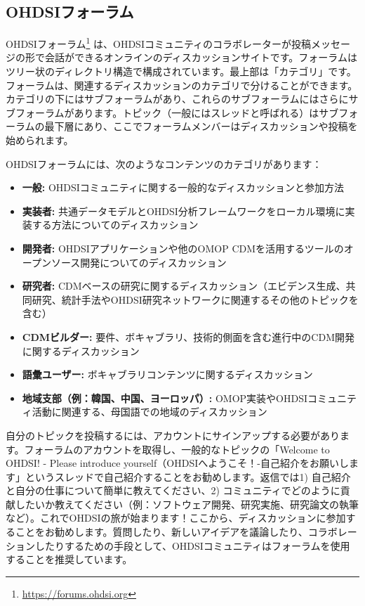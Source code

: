 \documentclass[
  11pt]{book}
\providecommand{\tightlist}{%
  \setlength{\itemsep}{0pt}\setlength{\parskip}{0pt}}
\theoremstyle{definition}
\theoremstyle{definition}
\theoremstyle{definition}
\theoremstyle{definition}
\theoremstyle{remark}
\begin{document}
\subsection{OHDSIフォーラム}\label{ohdsiux30d5ux30a9ux30fcux30e9ux30e0}

OHDSIフォーラム\footnote{\url{https://forums.ohdsi.org}} は、OHDSIコミュニティのコラボレーターが投稿メッセージの形で会話ができるオンラインのディスカッションサイトです。フォーラムはツリー状のディレクトリ構造で構成されています。最上部は「カテゴリ」です。フォーラムは、関連するディスカッションのカテゴリで分けることができます。カテゴリの下にはサブフォーラムがあり、これらのサブフォーラムにはさらにサブフォーラムがあります。トピック（一般にはスレッドと呼ばれる）はサブフォーラムの最下層にあり、ここでフォーラムメンバーはディスカッションや投稿を始められます。

OHDSIフォーラムには、次のようなコンテンツのカテゴリがあります：

\begin{itemize}
\tightlist
\item
  \textbf{一般:} OHDSIコミュニティに関する一般的なディスカッションと参加方法
\item
  \textbf{実装者:} 共通データモデルとOHDSI分析フレームワークをローカル環境に実装する方法についてのディスカッション
\item
  \textbf{開発者:} OHDSIアプリケーションや他のOMOP CDMを活用するツールのオープンソース開発についてのディスカッション
\item
  \textbf{研究者:} CDMベースの研究に関するディスカッション（エビデンス生成、共同研究、統計手法やOHDSI研究ネットワークに関連するその他のトピックを含む）
\item
  \textbf{CDMビルダー:} 要件、ボキャブラリ、技術的側面を含む進行中のCDM開発に関するディスカッション
\item
  \textbf{語彙ユーザー:} ボキャブラリコンテンツに関するディスカッション
\item
  \textbf{地域支部（例：韓国、中国、ヨーロッパ）:} OMOP実装やOHDSIコミュニティ活動に関連する、母国語での地域のディスカッション
\end{itemize}

自分のトピックを投稿するには、アカウントにサインアップする必要があります。フォーラムのアカウントを取得し、一般的なトピックの「Welcome to OHDSI! - Please introduce yourself（OHDSIへようこそ！-自己紹介をお願いします」というスレッドで自己紹介することをお勧めします。返信では1) 自己紹介と自分の仕事について簡単に教えてください、2) コミュニティでどのように貢献したいか教えてください（例：ソフトウェア開発、研究実施、研究論文の執筆など）。これでOHDSIの旅が始まります！ここから、ディスカッションに参加することをお勧めします。質問したり、新しいアイデアを議論したり、コラボレーションしたりするための手段として、OHDSIコミュニティはフォーラムを使用することを推奨しています。 
\end{document}
